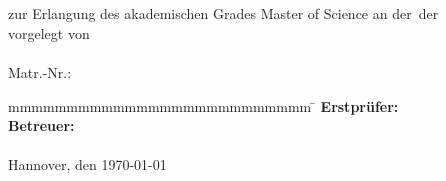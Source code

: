 \begin{titlepage}
\begin{spacing}{1}
\begin{center}
  \vspace*{84pt}	{\fontsize{24pt}{33pt}\selectfont\bfseries\titel }\\
	\vspace*{60pt}	{\fontsize{24pt}{33pt}\selectfont\bfseries\MakeUppercase\arbeit}\\
	\vspace*{60pt}	{\fontsize{14pt}{19pt}\selectfont zur Erlangung des akademischen Grades Master of                          Science an der \fakultaet \,der \luh}\\
	\vspace*{60pt}    {\fontsize{14pt}{19pt}\selectfont vorgelegt von\\}
	\vspace*{48pt}    {\fontsize{12pt}{16pt}\selectfont\autor\\Matr.-Nr.: \martrikelnr}\\
\end{center}
	\vspace{48pt}
	\begin{spacing}{1.2}
	\begin{tabbing}
		mmmmmmmmmmmmmmmmmmmmmmmmmm     \= \kill
		\textbf{Erstprüfer:}           \>  \pruefer\\
		\textbf{Betreuer:}              \>  \betreuer\\
		\vspace{42pt}\\{Hannover, den \today{}}
	\end{tabbing}
	\end{spacing}

\end{spacing}
\end{titlepage}
